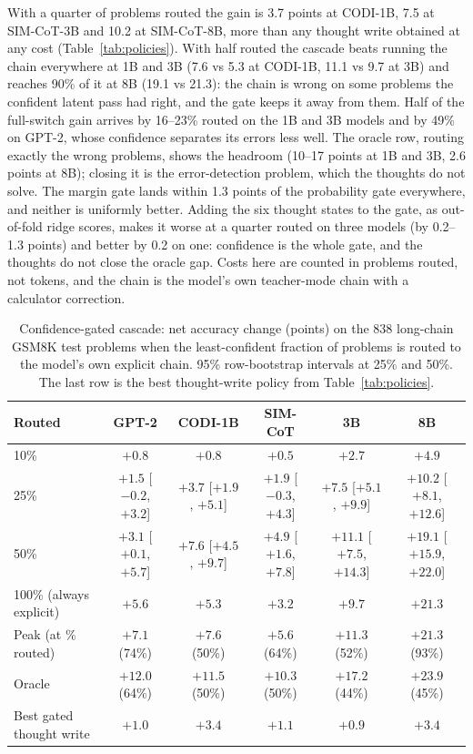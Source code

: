 \documentclass{article}
\begin{document}
With a quarter of problems routed the gain is 3.7 points at CODI-1B, 7.5 at SIM-CoT-3B and 10.2 at SIM-CoT-8B, more than any thought write obtained at any cost (Table~\ref{tab:policies}). With half routed the cascade beats running the chain everywhere at 1B and 3B (7.6 vs 5.3 at CODI-1B, 11.1 vs 9.7 at 3B) and reaches 90\% of it at 8B (19.1 vs 21.3): the chain is wrong on some problems the confident latent pass had right, and the gate keeps it away from them. Half of the full-switch gain arrives by 16--23\% routed on the 1B and 3B models and by 49\% on GPT-2, whose confidence separates its errors less well. The oracle row, routing exactly the wrong problems, shows the headroom (10--17 points at 1B and 3B, 2.6 points at 8B); closing it is the error-detection problem, which the thoughts do not solve. The margin gate lands within 1.3 points of the probability gate everywhere, and neither is uniformly better. Adding the six thought states to the gate, as out-of-fold ridge scores, makes it worse at a quarter routed on three models (by 0.2--1.3 points) and better by 0.2 on one: confidence is the whole gate, and the thoughts do not close the oracle gap. Costs here are counted in problems routed, not tokens, and the chain is the model's own teacher-mode chain with a calculator correction.

\begin{table}[h]
\caption{Confidence-gated cascade: net accuracy change (points) on the 838 long-chain GSM8K test problems when the least-confident fraction of problems is routed to the model's own explicit chain. 95\% row-bootstrap intervals at 25\% and 50\%. The last row is the best thought-write policy from Table~\ref{tab:policies}.}
\label{tab:cascade}
\centering
\scriptsize
\setlength{\tabcolsep}{1pt}
\begin{tabular}{lccccc}
\toprule
Routed & GPT-2 & CODI-1B & SIM-CoT & 3B & 8B \\
\midrule
10\% & $+0.8$ & $+0.8$ & $+0.5$ & $+2.7$ & $+4.9$ \\
25\% & $+1.5$ [$-0.2$, $+3.2$] & $+3.7$ [$+1.9$, $+5.1$] & $+1.9$ [$-0.3$, $+4.3$] & $+7.5$ [$+5.1$, $+9.9$] & $+10.2$ [$+8.1$, $+12.6$] \\
50\% & $+3.1$ [$+0.1$, $+5.7$] & $+7.6$ [$+4.5$, $+9.7$] & $+4.9$ [$+1.6$, $+7.8$] & $+11.1$ [$+7.5$, $+14.3$] & $+19.1$ [$+15.9$, $+22.0$] \\
100\% (always explicit) & $+5.6$ & $+5.3$ & $+3.2$ & $+9.7$ & $+21.3$ \\
Peak (at \% routed) & $+7.1$ (74\%) & $+7.6$ (50\%) & $+5.6$ (64\%) & $+11.3$ (52\%) & $+21.3$ (93\%) \\
Oracle & $+12.0$ (64\%) & $+11.5$ (50\%) & $+10.3$ (50\%) & $+17.2$ (44\%) & $+23.9$ (45\%) \\
\midrule
Best gated thought write & $+1.0$ & $+3.4$ & $+1.1$ & $+0.9$ & $+3.4$ \\
\bottomrule
\end{tabular}
\end{table}
\end{document}
